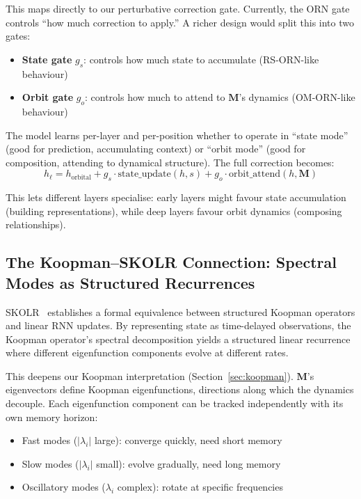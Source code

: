 \documentclass[11pt, a4paper]{article}
\newcommand{\M}{\mathbf{M}}
\theoremstyle{plain}
\theoremstyle{remark}
\begin{document}
This maps directly to our perturbative correction gate.
Currently, the ORN gate controls ``how much correction to apply.''
A richer design would split this into two gates:

\begin{itemize}[nosep]
    \item \textbf{State gate} $g_s$: controls how much state to accumulate (RS-ORN-like behaviour)
    \item \textbf{Orbit gate} $g_o$: controls how much to attend to $\M$'s dynamics (OM-ORN-like behaviour)
\end{itemize}

The model learns per-layer and per-position whether to operate in ``state mode'' (good for prediction, accumulating context) or ``orbit mode'' (good for composition, attending to dynamical structure).
The full correction becomes:
\begin{equation}
    h_\ell = h_{\text{orbital}} + g_s \cdot \text{state\_update}(h, s) + g_o \cdot \text{orbit\_attend}(h, \M)
\end{equation}

This lets different layers specialise: early layers might favour state accumulation (building representations), while deep layers favour orbit dynamics (composing relationships).

\subsection{The Koopman--SKOLR Connection: Spectral Modes as Structured Recurrences}\label{sec:skolr}

SKOLR~\cite{nath2025skolr} establishes a formal equivalence between structured Koopman operators and linear RNN updates.
By representing state as time-delayed observations, the Koopman operator's spectral decomposition yields a structured linear recurrence where different eigenfunction components evolve at different rates.

This deepens our Koopman interpretation (Section~\ref{sec:koopman}).
$\M$'s eigenvectors define Koopman eigenfunctions, directions along which the dynamics decouple.
Each eigenfunction component can be tracked independently with its own memory horizon:
\begin{itemize}[nosep]
    \item Fast modes ($|\lambda_i|$ large): converge quickly, need short memory
    \item Slow modes ($|\lambda_i|$ small): evolve gradually, need long memory
    \item Oscillatory modes ($\lambda_i$ complex): rotate at specific frequencies
\end{itemize}
\end{document}
